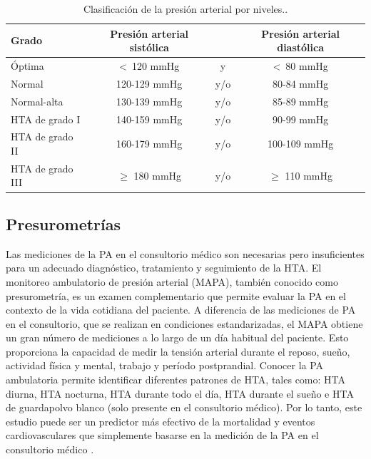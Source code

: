 \begin{table}[h]
	\centering
	\caption[Clasificación de la presión arterial por niveles]{Clasificación de la presión arterial por niveles.\protect\footnotemark.}
	\begin{tabular}{l c c c}    
		\toprule
		\textbf{Grado} 	      & \textbf{Presión arterial sistólica} 	& \textbf{}	& \textbf{Presión arterial diastólica}  \\
		\midrule
		Óptima                & <\ 120 mmHg                           & 	y			  & <\ 80 mmHg \\		
    Normal                & 120-129 mmHg                          &  	y/o			& 80-84 mmHg \\	
    Normal-alta           & 130-139 mmHg                          & 	y/o			& 85-89 mmHg \\	
    HTA de grado I        & 140-159 mmHg                          & 	y/o			& 90-99 mmHg \\
    HTA de grado II       & 160-179 mmHg                          & 	y/o			& 100-109 mmHg \\		
    HTA de grado III      & $\geq$  180 mmHg                      & 	y/o			& $\geq$  110 mmHg \\	
		\bottomrule
		\hline
	\end{tabular}
	\label{tab:TablaHTA}
\end{table}


\subsection{Presurometrías}

Las mediciones de la PA en el consultorio médico son necesarias pero insuficientes para un adecuado diagnóstico, 
tratamiento y seguimiento de la HTA. El monitoreo ambulatorio de presión arterial (MAPA), también conocido 
como presurometría, es un examen complementario que permite evaluar la PA en el contexto de la vida cotidiana 
del paciente. A diferencia de las mediciones de PA en el consultorio, que se realizan en condiciones 
estandarizadas, el MAPA obtiene un gran número de mediciones a lo largo de un día habitual del paciente. 
Esto proporciona la capacidad de medir la tensión arterial durante el reposo, sueño, actividad física y mental, 
trabajo y período postprandial. Conocer la PA ambulatoria permite identificar diferentes patrones de HTA, tales 
como: HTA diurna, HTA nocturna, HTA durante todo el día, HTA durante el sueño e HTA de guardapolvo blanco 
(solo presente en el consultorio médico). Por lo tanto, este estudio puede ser un predictor más efectivo de 
la mortalidad y eventos cardiovasculares que simplemente basarse en la medición de la PA en el 
consultorio médico \citep{CITE:7} \citep{CITE:5}.

